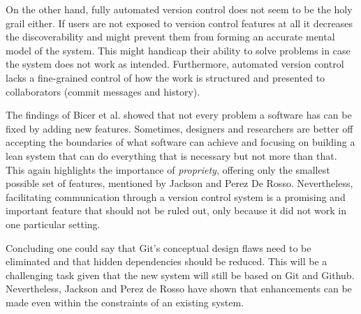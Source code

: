 On the other hand, fully automated version control does not seem to be the holy grail either. If users are not exposed to version control features at all it decreases the discoverability and might prevent them from forming an accurate mental model of the system. This might handicap their ability to solve problems in case the system does not work as intended. Furthermore, automated version control lacks a fine-grained control of how the work is structured and presented to collaborators (commit messages and history).

The findings of Bicer et al. showed that not every problem a software has can be fixed by adding new features. Sometimes, designers and researchers are better off accepting the boundaries of what software can achieve and focusing on building a lean system that can do everything that is necessary but not more than that. This again highlights the importance of \textit{propriety}, offering only the smallest possible set of features, mentioned by Jackson and Perez De Rosso. Nevertheless, facilitating communication through a version control system is a promising and important feature that should not be ruled out, only because it did not work in one particular setting.

Concluding one could say that Git's conceptual design flaws need to be eliminated and that hidden dependencies should be reduced. This will be a challenging task given that the new system will still be based on Git and Github. Nevertheless, Jackson and Perez de Rosso have shown that enhancements can be made even within the constraints of an existing system.
